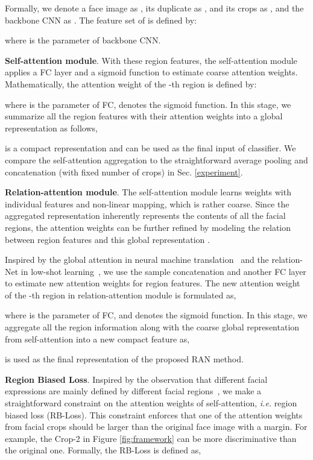\documentclass[journal]{IEEEtran}
\begin{document}
Formally, we denote a face image as , its duplicate as , and its crops as ,  and the backbone CNN as . The feature set  of  is defined by:

where  is the parameter of backbone CNN. 

\textbf{Self-attention module}. 
With these region features, the self-attention module applies a FC layer and a sigmoid function to estimate coarse attention weights. Mathematically, the attention weight of the -th region is defined by: 

where  is the parameter of FC,  denotes the sigmoid function. 
In this stage, we summarize all the region features with their attention weights into a global representation  as follows,

 is a compact representation and can be used as the final input of classifier. We compare the self-attention aggregation to the straightforward average pooling and concatenation (with fixed number of crops) in Sec. \ref{experiment}.

\textbf{Relation-attention module}.
The self-attention module learns weights with individual features and non-linear mapping, which is rather coarse. Since the aggregated representation  inherently represents the contents of all the facial regions, the attention weights can be further refined by modeling the relation between region features and this global representation .

Inspired by the global attention in neural machine translation~\cite{luong2015effective} and the relation-Net in low-shot learning~\cite{yang2018learning}, we use the sample concatenation and another FC layer to estimate new attention weights for region features. The new attention weight of the -th region in relation-attention module is formulated as,

where  is the parameter of FC, and  denotes the sigmoid function. In this stage, we aggregate all the region information along with the coarse global representation from self-attention into a new compact feature as,

 is used as the final representation of the proposed RAN method. 

\textbf{Region Biased Loss}.
Inspired by the observation that different facial expressions are mainly defined by different facial regions~\cite{boucher1975facial}, we make a straightforward constraint on the attention weights of self-attention, \textit{i.e.} region biased loss (RB-Loss).
This constraint enforces that one of the attention weights from facial crops should be larger than the original face image with a margin. For example, the Crop-2 in Figure \ref{fig:framework} can be more discriminative than the original one.
Formally, the RB-Loss is defined as,
\end{document}
